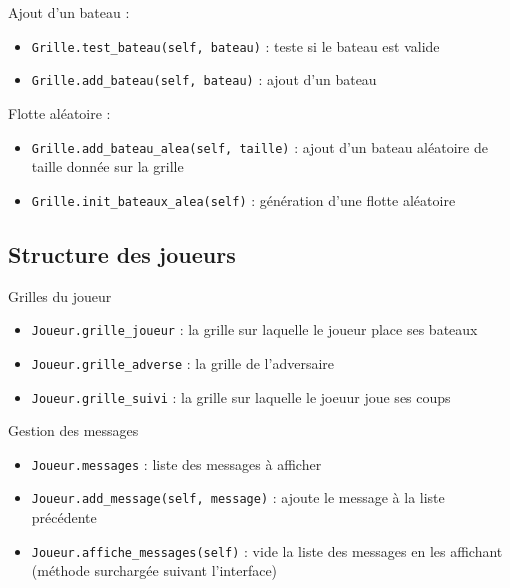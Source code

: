\begin{frame}
Ajout d'un bateau :
\begin{itemize}
\item \texttt{Grille.test\_bateau(self, bateau)} : teste si le bateau est valide
\item \texttt{Grille.add\_bateau(self, bateau)} : ajout d'un bateau 
\end{itemize}
\end{frame}

\begin{frame}
Flotte aléatoire :
\begin{itemize}
\item \texttt{Grille.add\_bateau\_alea(self, taille)} : ajout d'un bateau aléatoire de taille donnée sur la grille
\item \texttt{Grille.init\_bateaux\_alea(self)} : génération d'une flotte aléatoire
\end{itemize}
\end{frame}

\subsection{Structure des joueurs}
\begin{frame}{Grilles du joueur}
\begin{itemize}
\item \texttt{Joueur.grille\_joueur} : la grille sur laquelle le joueur place ses bateaux
\item \texttt{Joueur.grille\_adverse} : la grille de l'adversaire
\item \texttt{Joueur.grille\_suivi} : la grille sur laquelle le joeuur joue ses coups
\end{itemize}

\end{frame}

\begin{frame}{Gestion des messages}
\begin{itemize}
\item \texttt{Joueur.messages} : liste des messages à afficher
\item \texttt{Joueur.add\_message(self, message)} : ajoute le message à la liste précédente
\item \texttt{Joueur.affiche\_messages(self)} : vide la liste des messages en les affichant (méthode surchargée suivant l'interface)
\end{itemize}

\end{frame}


